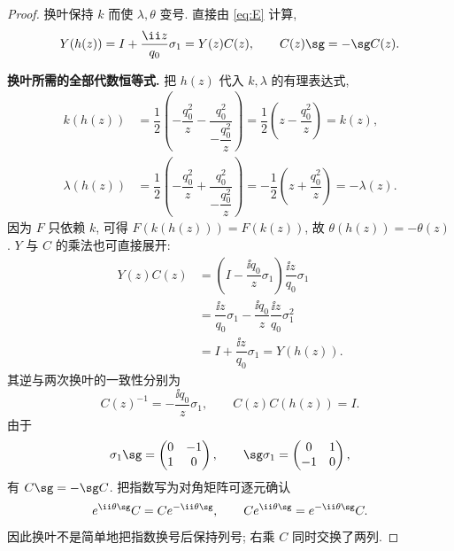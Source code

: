 \begin{proof}
换叶保持 $k$ 而使 $\lambda,\theta$ 变号. 直接由 \eqref{eq:E} 计算,
\begin{equation}\label{eq:Esheet}
Y(h(z))=I+\dfrac{\ii z}{q_0}\sigma_1=Y(z)C(z),\qquad
C(z)\sg=-\sg C(z).
\end{equation}

\par\medskip\noindent\textbf{换叶所需的全部代数恒等式.}\quad 
把 $h(z)$ 代入 $k,\lambda$ 的有理表达式,
\begin{align*}
k(h(z))
&=\dfrac{1}{2}\left(-\dfrac{q_0^2}{z}
-\dfrac{q_0^2}{-\dfrac{q_0^2}{z}}\right)
=\dfrac{1}{2}\left(z-\dfrac{q_0^2}{z}\right)=k(z),\\
\lambda(h(z))
&=\dfrac{1}{2}\left(-\dfrac{q_0^2}{z}
+\dfrac{q_0^2}{-\dfrac{q_0^2}{z}}\right)
=-\dfrac{1}{2}\left(z+\dfrac{q_0^2}{z}\right)=-\lambda(z).
\end{align*}
因为 $F$ 只依赖 $k$, 可得 $F(k(h(z)))=F(k(z))$,
故 $\theta(h(z))=-\theta(z)$.
$Y$ 与 $C$ 的乘法也可直接展开:
\begin{align*}
Y(z)C(z)
&=\left(I-\dfrac{\ii q_0}{z}\sigma_1\right)
\dfrac{\ii z}{q_0}\sigma_1\\
&=\dfrac{\ii z}{q_0}\sigma_1
-\dfrac{\ii q_0}{z}\dfrac{\ii z}{q_0}\sigma_1^2\\
&=I+\dfrac{\ii z}{q_0}\sigma_1=Y(h(z)).
\end{align*}
其逆与两次换叶的一致性分别为
\[
C(z)^{-1}=-\dfrac{\ii q_0}{z}\sigma_1,
\qquad C(z)C(h(z))=I.
\]
由于
\[
\sigma_1\sg=\begin{pmatrix}0&-1\\1&0\end{pmatrix},
\qquad
\sg\sigma_1=\begin{pmatrix}0&1\\-1&0\end{pmatrix},
\]
有 $C\sg=-\sg C$.
把指数写为对角矩阵可逐元确认
\[
e^{\ii\theta\sg}C
=C e^{-\ii\theta\sg},
\qquad
C e^{\ii\theta\sg}=e^{-\ii\theta\sg}C.
\]
因此换叶不是简单地把指数换号后保持列号;
右乘 $C$ 同时交换了两列.


\end{proof}
